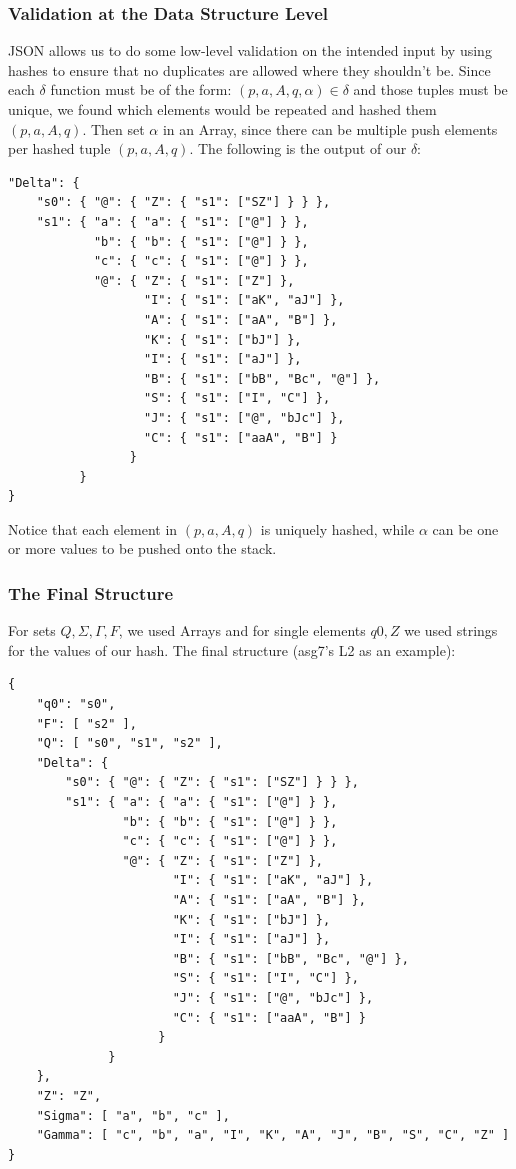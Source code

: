 \documentclass[a4paper]{article}
\begin{document}
\subsubsection{Validation at the Data Structure Level}
JSON allows us to do some low-level validation on the intended input by using
hashes to ensure that no duplicates are allowed where they shouldn't be. Since
each $\delta$ function must be of the form: $(p,a,A,q,\alpha)\in\delta$ and
those tuples must be unique, we found which elements would be repeated and
hashed them $(p, a, A, q)$. Then set $\alpha$ in an Array, since there can be
multiple push elements per hashed tuple $(p,a,A,q)$. The following is the output
of our $\delta$:
\begin{verbatim}
"Delta": {
    "s0": { "@": { "Z": { "s1": ["SZ"] } } },
    "s1": { "a": { "a": { "s1": ["@"] } },
            "b": { "b": { "s1": ["@"] } },
            "c": { "c": { "s1": ["@"] } },
            "@": { "Z": { "s1": ["Z"] },
                   "I": { "s1": ["aK", "aJ"] },
                   "A": { "s1": ["aA", "B"] },
                   "K": { "s1": ["bJ"] },
                   "I": { "s1": ["aJ"] },
                   "B": { "s1": ["bB", "Bc", "@"] },
                   "S": { "s1": ["I", "C"] },
                   "J": { "s1": ["@", "bJc"] },
                   "C": { "s1": ["aaA", "B"] }
                 }
          }
}
\end{verbatim}
Notice that each element in $(p,a,A,q)$ is uniquely hashed, while $\alpha$ can
be one or more values to be pushed onto the stack.
\subsubsection{The Final Structure}
For sets $Q, \Sigma, \Gamma, F$, we used Arrays and for single elements $q0, Z$
we used strings for the values of our hash. The final structure (asg7's L2 as an
example):
\begin{verbatim}
{
    "q0": "s0",
    "F": [ "s2" ],
    "Q": [ "s0", "s1", "s2" ],
    "Delta": {
        "s0": { "@": { "Z": { "s1": ["SZ"] } } },
        "s1": { "a": { "a": { "s1": ["@"] } },
                "b": { "b": { "s1": ["@"] } },
                "c": { "c": { "s1": ["@"] } },
                "@": { "Z": { "s1": ["Z"] },
                       "I": { "s1": ["aK", "aJ"] },
                       "A": { "s1": ["aA", "B"] },
                       "K": { "s1": ["bJ"] },
                       "I": { "s1": ["aJ"] },
                       "B": { "s1": ["bB", "Bc", "@"] },
                       "S": { "s1": ["I", "C"] },
                       "J": { "s1": ["@", "bJc"] },
                       "C": { "s1": ["aaA", "B"] }
                     }
              }
    },
    "Z": "Z",
    "Sigma": [ "a", "b", "c" ],
    "Gamma": [ "c", "b", "a", "I", "K", "A", "J", "B", "S", "C", "Z" ]
}
\end{verbatim}
\end{document}
